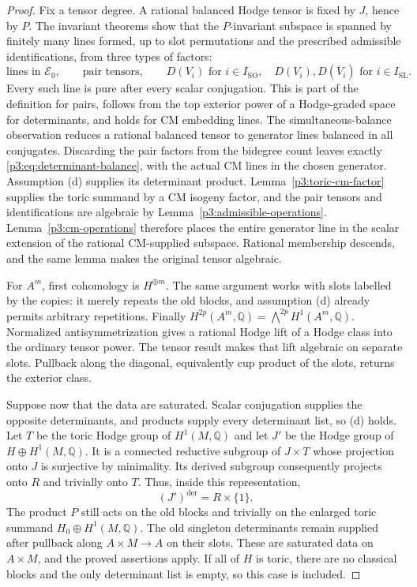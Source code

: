 \documentclass[11pt]{article}
\newcommand{\Q}{\mathbb Q}
\numberwithin{equation}{section}
\begin{document}
\begin{proof}
Fix a tensor degree.  A rational balanced Hodge tensor is fixed by
$J$, hence by $P$.  The invariant theorems show that the
$P$-invariant subspace is spanned by finitely many lines formed,
up to slot permutations and the prescribed admissible identifications,
from three types of factors:
\[
 \text{lines in }\mathcal E_0,\qquad
 \text{pair tensors},\qquad
 D(V_i)\text{ for }i\in I_{\mathrm{SO}},
 \quad D(V_i),D(\overline V_i)\text{ for }i\in I_{\mathrm{SL}}.
\]
Every such line is pure after every scalar conjugation.  This is part
of the definition for pairs, follows from the top exterior power of
a Hodge-graded space for determinants, and holds for CM embedding
lines.  The simultaneous-balance observation reduces a rational
balanced tensor to generator lines balanced in all conjugates.
Discarding the pair factors from the bidegree count leaves exactly
\eqref{p3:eq:determinant-balance}, with the actual CM lines in
the chosen generator.  Assumption (d) supplies its determinant
product.  Lemma~\ref{p3:toric-cm-factor} supplies the toric summand
by a CM isogeny factor, and the pair tensors and identifications are algebraic by
Lemma~\ref{p3:admissible-operations}.  Lemma~\ref{p3:cm-operations}
therefore places the entire generator line in the scalar extension
of the rational CM-supplied subspace.  Rational membership descends,
and the same lemma makes the original tensor algebraic.

For $A^m$, first cohomology is $H^{\oplus m}$.  The same argument
works with slots labelled by the copies: it merely repeats the old
blocks, and assumption (d) already permits arbitrary repetitions.
Finally
$H^{2p}(A^m,\Q)=\bigwedge^{2p}H^1(A^m,\Q)$.
Normalized antisymmetrization gives a rational Hodge lift of a Hodge
class into the ordinary tensor power.  The tensor result makes that
lift algebraic on separate slots.  Pullback along the diagonal,
equivalently cup product of the slots, returns the exterior class.

Suppose now that the data are saturated.  Scalar conjugation supplies
the opposite determinants, and products supply every determinant
list, so (d) holds.  Let $T$ be the toric Hodge group of
$H^1(M,\Q)$ and let $J'$ be the Hodge group of
$H\oplus H^1(M,\Q)$.  It is a connected reductive subgroup of
$J\times T$ whose projection onto $J$ is surjective by minimality.
Its derived subgroup consequently projects onto $R$ and trivially
onto $T$.  Thus, inside this representation,
\[
 (J')^{\mathrm{der}}=R\times\{1\}.
\]
The product $P$ still acts on the old blocks and trivially on the
enlarged toric summand $H_0\oplus H^1(M,\Q)$.  The old singleton
determinants remain supplied after pullback along $A\times M\to A$
on their slots.  These are saturated data on
$A\times M$, and the proved assertions apply.  If all of $H$ is
toric, there are no classical blocks and the only determinant list
is empty, so this case is included.
\end{proof}
\end{document}
